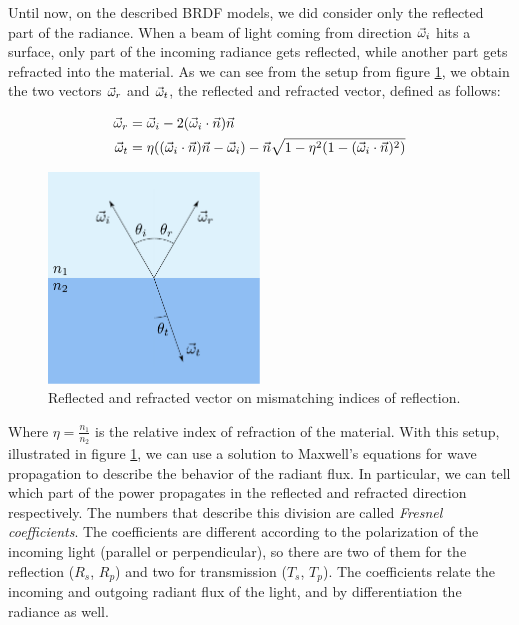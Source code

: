 Until now, on the described BRDF models, we did consider only the reflected part of the radiance. When a beam of light coming from direction $\vec{\omega}_i$ hits a surface, only part of the incoming radiance gets reflected, while another part gets refracted into the material. As we can see from the setup from figure \ref{fig:fresnelsetup}, we obtain the two vectors $\vec{\omega}_r$ and $\vec{\omega}_t$, the reflected and refracted vector, defined as follows:

\begin{equation*}
\begin{split}
\vec{\omega}_r &= \vec{\omega}_i - 2 (\vec{\omega}_i \cdot \vec{n}) \vec{n} \\
\vec{\omega}_t &= \eta ((\vec{\omega}_i \cdot \vec{n}) \vec{n} - \vec{\omega}_i) - \vec{n} \sqrt{1 - \eta^2 (1 - (\vec{\omega}_i \cdot \vec{n}) ^ 2)}
\end{split}
\end{equation*}

\begin{figure}[!ht]
\centering
\includegraphics[width=0.5\textwidth]{images/fresnelsetup.pdf}
\caption{Reflected and refracted vector on mismatching indices of reflection.}
\label{fig:fresnelsetup}
\end{figure}
 

Where $\eta = \frac{n_1}{n_2}$ is the relative index of refraction of the material. With this setup, illustrated in figure \ref{fig:fresnelsetup}, we can use a solution to Maxwell's equations for wave propagation to describe the behavior of the radiant flux. In particular, we can tell which part of the power propagates in the reflected and refracted direction respectively. The numbers that describe this division are called \emph{Fresnel coefficients}. The coefficients are different according to the polarization of the incoming light (parallel or perpendicular), so there are two of them for the reflection ($R_s$, $R_p$) and two for transmission ($T_s$, $T_p$). The coefficients relate the incoming and outgoing radiant flux of the light, and by differentiation the radiance as well.

